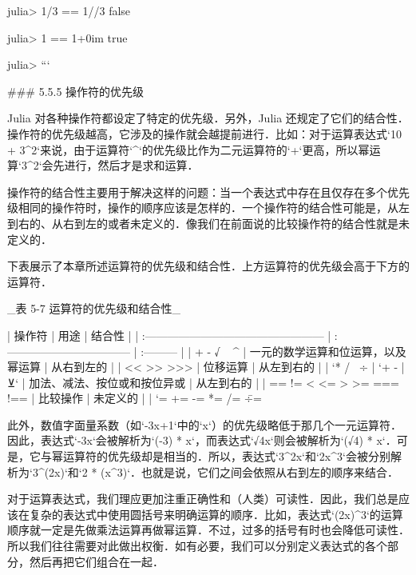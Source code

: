 julia> 1/3 == 1//3
false

julia> 1 == 1+0im
true

julia> 
```

### 5.5.5 操作符的优先级

Julia 对各种操作符都设定了特定的优先级．另外，Julia 还规定了它们的结合性．操作符的优先级越高，它涉及的操作就会越提前进行．比如：对于运算表达式`10 + 3^2`来说，由于运算符`^`的优先级比作为二元运算符的`+`更高，所以幂运算`3^2`会先进行，然后才是求和运算．

操作符的结合性主要用于解决这样的问题：当一个表达式中存在且仅存在多个优先级相同的操作符时，操作的顺序应该是怎样的．一个操作符的结合性可能是，从左到右的、从右到左的或者未定义的．像我们在前面说的比较操作符的结合性就是未定义的．

下表展示了本章所述运算符的优先级和结合性．上方运算符的优先级会高于下方的运算符．

_表 5-7 运算符的优先级和结合性_

| 操作符                                            | 用途                               | 结合性     |
| :------------------------------------------------ | :--------------------------------- | :--------- |
| + - √ ~ ^                                         | 一元的数学运算和位运算，以及幂运算 | 从右到左的 |
| << >> >>>                                         | 位移运算                           | 从左到右的 |
| `* / \ ÷ %
| `+ - | ⊻`                                         | 加法、减法、按位或和按位异或       | 从左到右的 |
| == != < <= > >= === !==                           | 比较操作                           | 未定义的   |
| `= += -= *= /= \= ÷= %

此外，数值字面量系数（如`-3x+1`中的`x`）的优先级略低于那几个一元运算符．因此，表达式`-3x`会被解析为`(-3) * x`，而表达式`√4x`则会被解析为`(√4) * x`．可是，它与幂运算符的优先级却是相当的．所以，表达式`3^2x`和`2x^3`会被分别解析为`3^(2x)`和`2 * (x^3)`．也就是说，它们之间会依照从右到左的顺序来结合．

对于运算表达式，我们理应更加注重正确性和（人类）可读性．因此，我们总是应该在复杂的表达式中使用圆括号来明确运算的顺序．比如，表达式`(2x)^3`的运算顺序就一定是先做乘法运算再做幂运算．不过，过多的括号有时也会降低可读性．所以我们往往需要对此做出权衡．如有必要，我们可以分别定义表达式的各个部分，然后再把它们组合在一起．